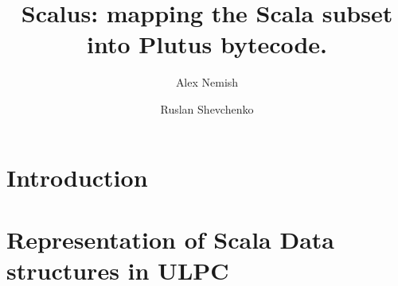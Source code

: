 \documentclass{article}
\title{ Scalus: mapping the Scala subset into Plutus bytecode. }
\author{ Alex Nemish \and Ruslan Shevchenko }
\begin{document}
\section{ Introduction }


\section{ Representation of Scala Data structures in ULPC }
\end{document}
